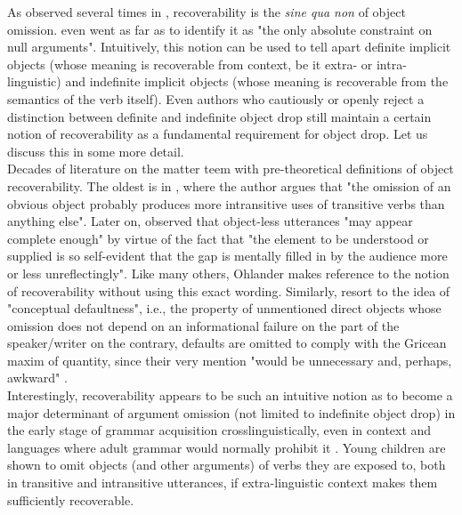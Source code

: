 As observed several times in , recoverability is the \textit{sine qua non} of object omission. \textcite{Cote1996} even went as far as to identify it as "the only absolute constraint on null arguments". Intuitively, this notion can be used to tell apart definite implicit objects (whose meaning is recoverable from context, be it extra- or intra-linguistic) and indefinite implicit objects (whose meaning is recoverable from the semantics of the verb itself). Even authors who cautiously \parencite{Resnik1993, Resnik1996, OlsenResnik1997} or openly \parencite{Glass2013, Glass2020, glass2022english} reject a distinction between definite and indefinite object drop still maintain a certain notion of recoverability as a fundamental requirement for object drop. Let us discuss this in some more detail.\\
Decades of literature on the matter teem with pre-theoretical definitions of object recoverability. The oldest is in \textcite[321]{Jespersen1927}, where the author argues that "the omission of an obvious object probably produces more intransitive uses of transitive verbs than anything else". Later on, \textcite[105]{Ohlander1943} observed that object-less utterances "may appear complete enough" by virtue of the fact that "the element to be understood or supplied is so self-evident that the gap is mentally filled in by the audience more or less unreflectingly". Like many others, Ohlander makes reference to the notion of recoverability without using this exact wording. Similarly, \textcite{HickmanEtAl2016} resort to the idea of "conceptual defaultness", i.e., the property of unmentioned direct objects whose omission does not depend on an informational failure on the part of the speaker/writer \textemdash on the contrary, defaults are omitted to comply with the Gricean maxim of quantity, since their very mention "would be unnecessary and, perhaps, awkward" \parencite[516]{HickmanEtAl2016}.\\
Interestingly, recoverability appears to be such an intuitive notion as to become a major determinant of argument omission (not limited to indefinite object drop) in the early stage of grammar acquisition crosslinguistically, even in context and languages where adult grammar would normally prohibit it \parencite{allen2000discourse, RatitamkulEtAl2004, Medina2007, sopata2016null, Rasetti2003, PerezLerouxEtAl2011, PerezLerouxEtAl2013, Perez-LerouxEtAl2018, OGradyEtAl2008, Ingham1993}. Young children are shown to omit objects (and other arguments) of verbs they are exposed to, both in transitive and intransitive utterances, if extra-linguistic context makes them sufficiently recoverable.


